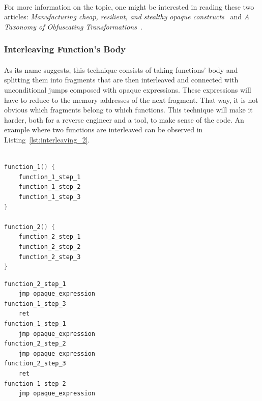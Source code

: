 \paragraph{}
For more information on the topic, one might be interested in reading these two articles: \textit{Manufacturing cheap, resilient, and stealthy opaque constructs}~\cite{collberg1998manufacturing} and \textit{A Taxonomy of Obfuscating Transformations}~\cite{collberg1997taxonomy}.

\subsubsection{Interleaving Function's Body}
\paragraph{}
As its name suggests, this technique consists of taking functions' body and splitting them into fragments that are then interleaved and connected with unconditional jumps composed with opaque expressions. These expressions will have to reduce to the memory addresses of the next fragment. That way, it is not obvious which fragments belong to which functions. This technique will make it harder, both for a reverse engineer and a tool, to make sense of the code. An example where two functions are interleaved can be observed in Listing~\ref{lst:interleaving_2}. \\ \\

\noindent\begin{minipage}{.45\textwidth}
	\begin{lstlisting}[caption={Two functions and their body.}, label={lst:interleaving_1}, frame=tlrb, language=C]
function_1() {
	function_1_step_1
	function_1_step_2
	function_1_step_3
}
	
function_2() {
	function_2_step_1
	function_2_step_2
	function_2_step_3
}
	\end{lstlisting}
\end{minipage}\hfill
\begin{minipage}{.45\textwidth}
	\begin{lstlisting}[caption={Interleaving of the two functions found in Listing~\ref{lst:interleaving_2}. Inspired from the book Reversing: \textit{Reversing: Secrets of Reverse Engineering}~\cite{eilam2005reversing}.}, label={lst:interleaving_2}, frame=tlrb, language={[x86masm]Assembler}]
function_2_step_1
	jmp opaque_expression
function_1_step_3
	ret
function_1_step_1
	jmp opaque_expression
function_2_step_2
	jmp opaque_expression
function_2_step_3   
	ret     
function_1_step_2
	jmp opaque_expression
	\end{lstlisting}
\end{minipage}

